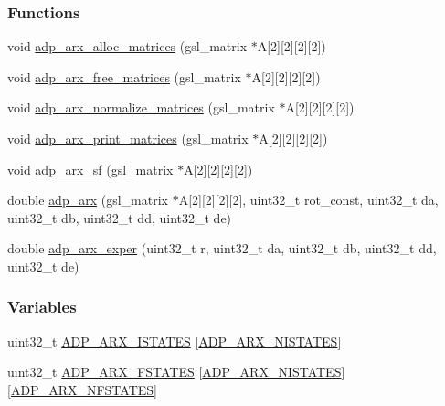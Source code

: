 \subsubsection*{\-Functions}
\begin{DoxyCompactItemize}
\item 
void \hyperlink{adp-arx_8hh_a0e3aa2c19e8b7d5fcba1e89cf006db89}{adp\-\_\-arx\-\_\-alloc\-\_\-matrices} (gsl\-\_\-matrix $\ast$\-A\mbox{[}2\mbox{]}\mbox{[}2\mbox{]}\mbox{[}2\mbox{]}\mbox{[}2\mbox{]})
\item 
void \hyperlink{adp-arx_8hh_ae1fcdf1ecd195a8f04fb0326668bf26b}{adp\-\_\-arx\-\_\-free\-\_\-matrices} (gsl\-\_\-matrix $\ast$\-A\mbox{[}2\mbox{]}\mbox{[}2\mbox{]}\mbox{[}2\mbox{]}\mbox{[}2\mbox{]})
\item 
void \hyperlink{adp-arx_8hh_ac01a2e9e7af3e0d465790661d367cb16}{adp\-\_\-arx\-\_\-normalize\-\_\-matrices} (gsl\-\_\-matrix $\ast$\-A\mbox{[}2\mbox{]}\mbox{[}2\mbox{]}\mbox{[}2\mbox{]}\mbox{[}2\mbox{]})
\item 
void \hyperlink{adp-arx_8hh_a06fdc4a92e7c1cac3d6ffd193ac6ccdb}{adp\-\_\-arx\-\_\-print\-\_\-matrices} (gsl\-\_\-matrix $\ast$\-A\mbox{[}2\mbox{]}\mbox{[}2\mbox{]}\mbox{[}2\mbox{]}\mbox{[}2\mbox{]})
\item 
void \hyperlink{adp-arx_8hh_afa557fabb780c1febded3e85fe3c7510}{adp\-\_\-arx\-\_\-sf} (gsl\-\_\-matrix $\ast$\-A\mbox{[}2\mbox{]}\mbox{[}2\mbox{]}\mbox{[}2\mbox{]}\mbox{[}2\mbox{]})
\item 
double \hyperlink{adp-arx_8hh_a9788b8bb5ea34b5d310b22e95ae80ab9}{adp\-\_\-arx} (gsl\-\_\-matrix $\ast$\-A\mbox{[}2\mbox{]}\mbox{[}2\mbox{]}\mbox{[}2\mbox{]}\mbox{[}2\mbox{]}, uint32\-\_\-t rot\-\_\-const, uint32\-\_\-t da, uint32\-\_\-t db, uint32\-\_\-t dd, uint32\-\_\-t de)
\item 
double \hyperlink{adp-arx_8hh_a3121eabeb0597c8e6f1945e96a69ae62}{adp\-\_\-arx\-\_\-exper} (uint32\-\_\-t r, uint32\-\_\-t da, uint32\-\_\-t db, uint32\-\_\-t dd, uint32\-\_\-t de)
\end{DoxyCompactItemize}
\subsubsection*{\-Variables}
\begin{DoxyCompactItemize}
\item 
uint32\-\_\-t \hyperlink{adp-arx_8hh_a94f941841e2bc961bc9abd1c7e0b8513}{\-A\-D\-P\-\_\-\-A\-R\-X\-\_\-\-I\-S\-T\-A\-T\-E\-S} \mbox{[}\hyperlink{adp-arx_8hh_af9236f8d08a54b97ed2199271de979f6}{\-A\-D\-P\-\_\-\-A\-R\-X\-\_\-\-N\-I\-S\-T\-A\-T\-E\-S}\mbox{]}
\item 
uint32\-\_\-t \hyperlink{adp-arx_8hh_af70040b1b46c82f1fbe37b5bab89d7db}{\-A\-D\-P\-\_\-\-A\-R\-X\-\_\-\-F\-S\-T\-A\-T\-E\-S} \mbox{[}\hyperlink{adp-arx_8hh_af9236f8d08a54b97ed2199271de979f6}{\-A\-D\-P\-\_\-\-A\-R\-X\-\_\-\-N\-I\-S\-T\-A\-T\-E\-S}\mbox{]}\mbox{[}\hyperlink{adp-arx_8hh_a233a0b6f32ce3bbaac71e99d06e26e1d}{\-A\-D\-P\-\_\-\-A\-R\-X\-\_\-\-N\-F\-S\-T\-A\-T\-E\-S}\mbox{]}
\end{DoxyCompactItemize}


